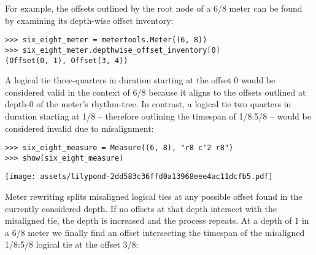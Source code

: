 For example, the offsets outlined by the root node of a 6/8 meter can be found
by examining its depth-wise offset inventory:

\begin{comment}
<abjad>
six_eight_meter = metertools.Meter((6, 8))
six_eight_meter.depthwise_offset_inventory[0]
</abjad>
\end{comment}

\begin{abjadbookoutput}
\begin{singlespacing}
\vspace{-0.5\baselineskip}
\begin{verbatim}
>>> six_eight_meter = metertools.Meter((6, 8))
>>> six_eight_meter.depthwise_offset_inventory[0]
(Offset(0, 1), Offset(3, 4))
\end{verbatim}
\end{singlespacing}
\end{abjadbookoutput}

\noindent A logical tie three-quarters in duration starting at the offset 0
would be considered valid in the context of 6/8 because it aligns to the
offsets outlined at depth-0 of the meter's rhythm-tree. In contrast, a logical
tie two quarters in duration starting at 1/8 -- therefore outlining the
timespan of 1/8:5/8 -- would be considered invalid due to misalignment:

\begin{comment}
<abjad>
six_eight_measure = Measure((6, 8), "r8 c'2 r8")
show(six_eight_measure)
</abjad>
\end{comment}

\begin{abjadbookoutput}
\begin{singlespacing}
\vspace{-0.5\baselineskip}
\begin{verbatim}
>>> six_eight_measure = Measure((6, 8), "r8 c'2 r8")
>>> show(six_eight_measure)
\end{verbatim}
\noindent\texttt{[image: assets/lilypond-2dd583c36ffd0a13968eee4ac11dcfb5.pdf]}
\end{singlespacing}
\end{abjadbookoutput}

\noindent Meter rewriting splits misaligned logical ties at any possible offset
found in the currently considered depth. If no offsets at that depth intersect
with the misaligned tie, the depth is increased and the process repeats. At a
depth of 1 in a 6/8 meter we finally find an offset intersecting the timespan
of the misaligned 1/8:5/8 logical tie at the offset 3/8:

